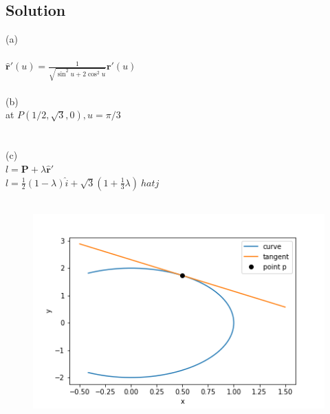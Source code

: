 \documentclass{article}
\renewcommand{\vec}[1]{\bm{#1}} %
\begin{document}
    \subsection*{Solution}
    \begin{centering}
    (a) \\
     \\
    $\mathbf{\hat{r}'}(u) = \frac{1}{\sqrt{\sin ^2 u + 2 \cos ^2 u}} \mathbf{r'}(u)$ \\
     \\
    (b) \\
    at $P(1/2, \sqrt{3}, 0), u = \pi/3$ \\
     \\
     \\
    (c) \\
    $l = \mathbf{\vec{P}} + \lambda \mathbf{\hat{r}'}$ \\
    $l = \frac{1}{2} (1 - \lambda) \hat{i} + \sqrt{3} (1 + \frac{1}{3} \lambda) \ hat{j}$ \\
     \\
    
    \begin{figure}[h]
    	\centering
    	\includegraphics[height=0.4\textheight]{p2}
    \end{figure}
    
    
    
    \end{centering}
    
\end{document}
